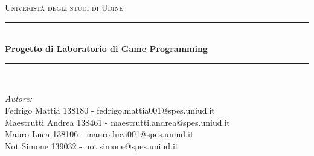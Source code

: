 \documentclass[12pt]{article}
\begin{document}
\begin{titlepage}

\newcommand{\HRule}{\rule{\linewidth}{0.5mm}} %

\center %
 

\textsc{\LARGE Univeristà degli studi di Udine}\\[1.5cm] %


\HRule \\[0.4cm]
{ \huge \bfseries Progetto di Laboratorio di Game Programming}\\[0.4cm] %
\HRule \\[1.5cm]
 

\begin{minipage}{1\textwidth}
\begin{flushleft} \large
\emph{Autore:}\\
Fedrigo Mattia 138180 - fedrigo.mattia001@spes.uniud.it\\
Maestrutti Andrea 138461 - maestrutti.andrea@spes.uniud.it\\
Mauro Luca 138106 - mauro.luca001@spes.uniud.it\\
Not Simone 139032 - not.simone@spes.uniud.it\\

\end{flushleft}
\end{minipage}
~
\begin{minipage}{0.4\textwidth}

\end{minipage}\\[2cm]



\end{titlepage}
\end{document}
